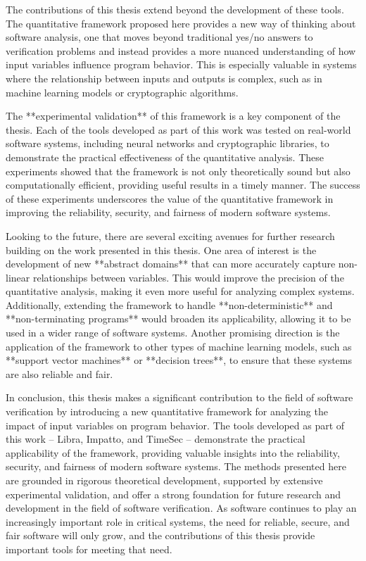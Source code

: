 {The contributions of this thesis extend beyond the development of these tools. The quantitative framework proposed here provides a new way of thinking about software analysis, one that moves beyond traditional yes/no answers to verification problems and instead provides a more nuanced understanding of how input variables influence program behavior. This is especially valuable in systems where the relationship between inputs and outputs is complex, such as in machine learning models or cryptographic algorithms.

The **experimental validation** of this framework is a key component of the thesis. Each of the tools developed as part of this work was tested on real-world software systems, including neural networks and cryptographic libraries, to demonstrate the practical effectiveness of the quantitative analysis. These experiments showed that the framework is not only theoretically sound but also computationally efficient, providing useful results in a timely manner. The success of these experiments underscores the value of the quantitative framework in improving the reliability, security, and fairness of modern software systems.

Looking to the future, there are several exciting avenues for further research building on the work presented in this thesis. One area of interest is the development of new **abstract domains** that can more accurately capture non-linear relationships between variables. This would improve the precision of the quantitative analysis, making it even more useful for analyzing complex systems. Additionally, extending the framework to handle **non-deterministic** and **non-terminating programs** would broaden its applicability, allowing it to be used in a wider range of software systems. Another promising direction is the application of the framework to other types of machine learning models, such as **support vector machines** or **decision trees**, to ensure that these systems are also reliable and fair.

In conclusion, this thesis makes a significant contribution to the field of software verification by introducing a new quantitative framework for analyzing the impact of input variables on program behavior. The tools developed as part of this work -- Libra, Impatto, and TimeSec -- demonstrate the practical applicability of the framework, providing valuable insights into the reliability, security, and fairness of modern software systems. The methods presented here are grounded in rigorous theoretical development, supported by extensive experimental validation, and offer a strong foundation for future research and development in the field of software verification. As software continues to play an increasingly important role in critical systems, the need for reliable, secure, and fair software will only grow, and the contributions of this thesis provide important tools for meeting that need.

}
